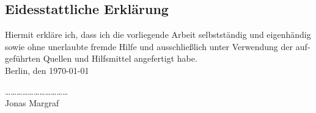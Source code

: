 
\begin{otherlanguage}{ngerman}
\section*{Eidesstattliche Erklärung}
\vspace{1cm}
Hiermit erkläre ich, dass ich die vorliegende Arbeit selbstständig und
eigenhändig sowie ohne unerlaubte fremde Hilfe und ausschließlich unter
Verwendung der aufgeführten Quellen und Hilfsmittel angefertigt habe.\\
Berlin, den \today\par
\vspace{2cm}
\noindent\ldots\ldots\ldots\ldots\ldots\ldots\ldots\ldots\ldots\ldots\ldots\\
Jonas Margraf
\newpage
\end{otherlanguage}
